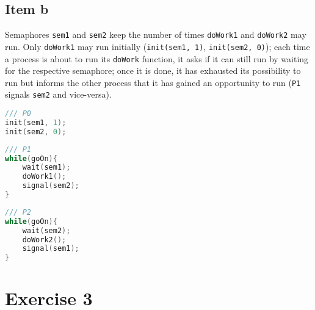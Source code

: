 {\subsection{Item b}
Semaphores \texttt{sem1} and \texttt{sem2} keep the number of times \texttt{doWork1} and \texttt{doWork2} may run. Only \texttt{doWork1} may run initially (\texttt{init(sem1, 1)}, \texttt{init(sem2, 0)}); each time a process is about to run its \texttt{doWork} function, it asks if it can still run by waiting for the respective semaphore; once it is done, it has exhausted its possibility to run but informs the other process that it has gained an opportunity to run (\texttt{P1} signals \texttt{sem2} and vice-versa).
\begin{lstlisting}[language=C]
/// P0
init(sem1, 1);
init(sem2, 0);
\end{lstlisting}
\begin{center}
\begin{minipage}{0.47\textwidth}\begin{lstlisting}[language=C]
/// P1
while(goOn){
    wait(sem1);
    doWork1();
    signal(sem2);
}
\end{lstlisting} \end{minipage} \hspace{2em}
\begin{minipage}{0.47\textwidth} \begin{lstlisting}[language=C]
/// P2
while(goOn){
    wait(sem2);
    doWork2();
    signal(sem1);
}
\end{lstlisting} \end{minipage}
\end{center}

\section{Exercise 3}

}
